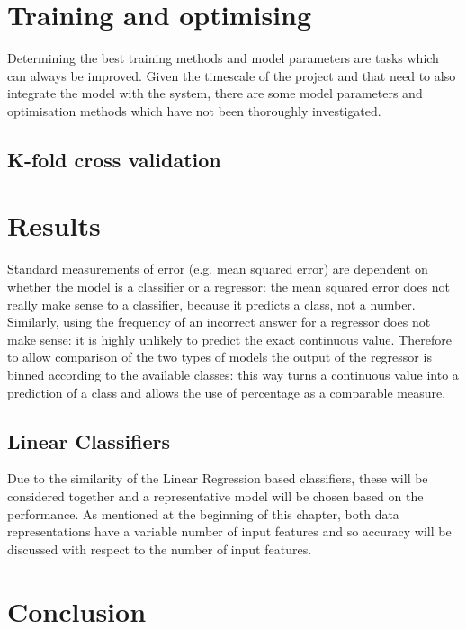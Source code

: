 \section{Training and optimising}
Determining the best training methods and model parameters are tasks which can always be improved. Given the timescale of the project and that need to also integrate the model with the system, there are some model parameters and optimisation methods which have not been thoroughly investigated.

\subsection{K-fold cross validation}
\section{Results}
Standard measurements of error (e.g. mean squared error) are dependent on whether the model is a classifier or a regressor: the mean squared error does not really make sense to a classifier, because it predicts a class, not a number. Similarly, using the frequency of an incorrect answer for a regressor does not make sense: it is highly unlikely to predict the exact continuous value. Therefore to allow comparison of the two types of models the output of the regressor is binned according to the available classes: this way turns a continuous value into a prediction of a class and allows the use of percentage as a comparable measure.

\subsection{Linear Classifiers}
Due to the similarity of the Linear Regression based classifiers, these will be considered together and a representative model will be chosen based on the performance. As mentioned at the beginning of this chapter, both data representations have a variable number of input features and so accuracy will be discussed with respect to the number of input features.

\section{Conclusion}

